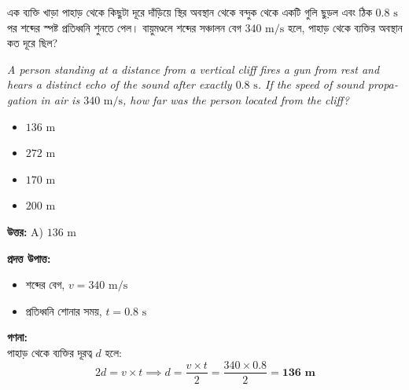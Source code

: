 \documentclass[12pt, a4paper]{article}
\begin{document}
\begin{tcolorbox}[questionbox={প্রশ্ন (Question) 4}]
    \noindent
    এক ব্যক্তি খাড়া পাহাড় থেকে কিছুটা দূরে দাঁড়িয়ে স্থির অবস্থান থেকে বন্দুক থেকে একটি গুলি ছুড়ল এবং ঠিক $0.8\text{ s}$ পর শব্দের স্পষ্ট প্রতিধ্বনি শুনতে পেল। বায়ুমণ্ডলে শব্দের সঞ্চালন বেগ $340\text{ m/s}$ হলে, পাহাড় থেকে ব্যক্তির অবস্থান কত দূরে ছিল?
    
    \vspace{0.8em}
    \begin{english}
    \noindent\textit{\color{darkgray}
    A person standing at a distance from a vertical cliff fires a gun from rest and hears a distinct echo of the sound after exactly $0.8\text{ s}$. If the speed of sound propagation in air is $340\text{ m/s}$, how far was the person located from the cliff?
    }
    \end{english}
\end{tcolorbox}

\begin{itemize}[label={}, leftmargin=1cm, itemsep=0.5em]
    \item[\textbf{A)}] $136\text{ m}$
    \item[\textbf{B)}] $272\text{ m}$
    \item[\textbf{C)}] $170\text{ m}$
    \item[\textbf{D)}] $200\text{ m}$
\end{itemize}

\vspace{0.5em}
\begin{tcolorbox}[answerbox]
    \textbf{\color{success} উত্তর:} A) $136\text{ m}$
\end{tcolorbox}
\vspace{1em}

\begin{tcolorbox}[solutionbox={সমাধান (Solution)}]
    \noindent
    \textbf{প্রদত্ত উপাত্ত:}
    \begin{itemize}[leftmargin=1.5em, itemsep=0.2em]
        \item শব্দের বেগ, $v = 340\text{ m/s}$
        \item প্রতিধ্বনি শোনার সময়, $t = 0.8\text{ s}$
    \end{itemize}

    \vspace{0.6em}
    \noindent\textbf{গণনা:} \\
    পাহাড় থেকে ব্যক্তির দূরত্ব $d$ হলে:
    \[ 2d = v \times t \implies d = \frac{v \times t}{2} = \frac{340 \times 0.8}{2} = \mathbf{136\text{ m}} \]
\end{tcolorbox}
\end{document}
